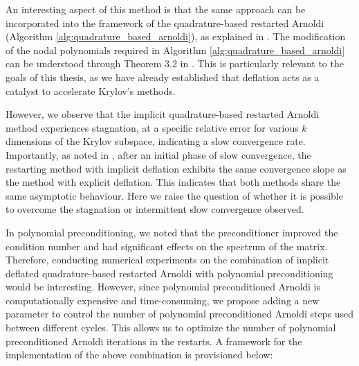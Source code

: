 An interesting aspect of this method is that the same approach can be incorporated into the framework of the quadrature-based restarted Arnoldi (Algorithm \ref{alg:quadrature_based_arnoldi}), as explained in \cite{52}. The modification of the nodal polynomials required in Algorithm \ref{alg:quadrature_based_arnoldi} can be understood through Theorem 3.2 in \cite{56}. This is particularly relevant to the goals of this thesis, as we have already established that deflation acts as a catalyst to accelerate Krylov's methods.

However, we observe that the implicit quadrature-based restarted Arnoldi method experiences stagnation, at a specific relative error for various $k$ dimensions of the Krylov subspace, indicating a slow convergence rate. Importantly, as noted in \cite{52}, after an initial phase of slow convergence, the restarting method with implicit deflation exhibits the same convergence slope as the method with explicit deflation. This indicates that both methods share the same asymptotic behaviour. Here we raise the question of whether it is possible to overcome the stagnation or intermittent slow convergence observed.

In polynomial preconditioning, we noted that the preconditioner improved the condition number and had significant effects on the spectrum of the matrix. Therefore, conducting numerical experiments on the combination of implicit deflated quadrature-based restarted Arnoldi with polynomial preconditioning would be interesting. However, since polynomial preconditioned Arnoldi is computationally expensive and time-consuming, we propose adding a new parameter to control the number of polynomial preconditioned Arnoldi steps used between different cycles. This allows us to optimize the number of polynomial preconditioned Arnoldi iterations in the restarts. A framework for the implementation of the above combination is provisioned below:

